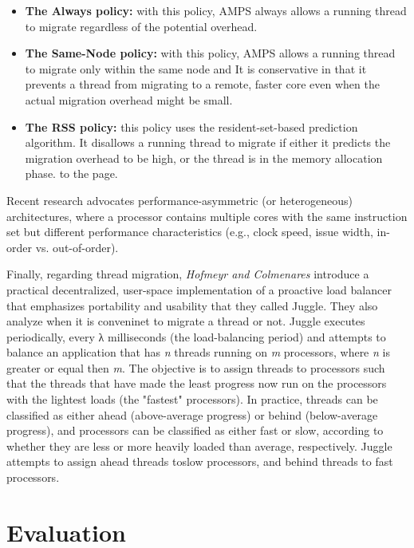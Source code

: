 \documentclass[a4paper,10pt]{article}
\begin{document}
\begin{multicols}{2}
\begin{itemize}
    \item \textbf{The Always policy:} with this policy, AMPS always allows a running thread to migrate regardless of the potential overhead.
    \item \textbf{The Same-Node policy:} with this policy, AMPS allows a running thread to migrate only within the same node and It is conservative in that it prevents a thread from migrating to a remote, faster core even when the actual migration overhead might be small.
   \item \textbf{The RSS policy:} this policy uses the resident-set-based prediction algorithm. It disallows a running thread to migrate if either it predicts the migration overhead to be high, or the thread is in the memory allocation phase.
to the page.
\end{itemize}

Recent research \cite{Balakrishnan05theimpact} advocates performance-asymmetric (or heterogeneous) architectures, where a processor contains multiple cores with the same instruction set but different performance characteristics (e.g., clock speed, issue width, in-order vs. out-of-order).\par
\parindent 10mm Finally, regarding thread migration, \emph{Hofmeyr and Colmenares} \cite{juggle} introduce a practical decentralized, user-space implementation of a proactive load balancer that emphasizes portability and usability that they called Juggle. They also analyze when it is conveninet to migrate a thread or not. Juggle executes periodically, every λ milliseconds (the load-balancing period) and attempts to balance an application that has \emph{n} threads running on \emph{m} processors, where \emph{n} is greater or equal then \emph{m}. The objective is to assign threads to processors such that the threads that have made the least progress now run on the processors with the lightest loads (the "fastest" processors). In practice, threads can be classified as either ahead (above-average progress) or behind (below-average progress), and processors can be classified as either fast or slow, according to whether they are less or more heavily loaded than average, respectively.  Juggle attempts to assign ahead threads toslow processors, and behind threads to fast processors.

\section{Evaluation}


\end{multicols}
\end{document}
